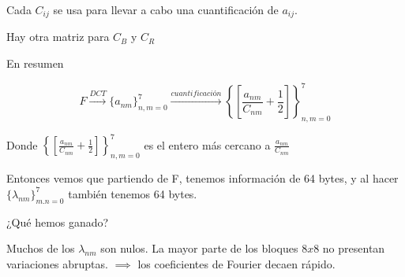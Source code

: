 			Cada $C_{ij}$ se usa para llevar a cabo una cuantificación de $a_{ij}$.

			Hay otra matriz para $C_B$ y $C_R$

			\begin{framed}
				En resumen

				$$ F \xrightarrow{DCT} \{ a_{nm} \}^{7}_{n,m = 0} \xrightarrow{cuantificación} \left\{ \left[ \frac{a_{nm}}{C_{nm}} + \frac{1}{2} \right] \right\}^{7}_{n,m = 0} $$

				Donde $\left\{ \left[ \frac{a_{nm}}{C_{nm}} + \frac{1}{2} \right] \right\}^{7}_{n,m = 0}$ es el entero más cercano a $\frac{a_{nm}}{C_{nm}}$
			\end{framed}








Entonces vemos que partiendo de F, tenemos información de 64 bytes, y al hacer $\{\lambda_{nm}\}^7_{m.n=0}$ también tenemos 64 bytes.

¿Qué hemos ganado?

Muchos de los $\lambda_{nm}$ son nulos.
La mayor parte de los bloques $8x8$ no presentan variaciones abruptas. $\implies$ los coeficientes de Fourier decaen rápido.

